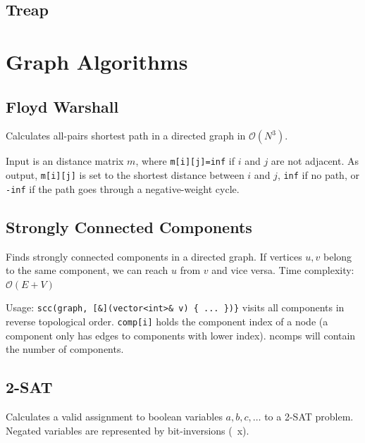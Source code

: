 \documentclass{article}
\begin{document}
\pagebreak

\subsection*{Treap}


\pagebreak

\section*{Graph Algorithms}

\subsection*{Floyd Warshall}

Calculates all-pairs shortest path in a directed graph in $\mathcal{O}(N^3)$.

Input is an distance matrix $m$, where \lstinline{m[i][j]=inf} if $i$ and $j$ are not adjacent.
As output, \lstinline{m[i][j]} is set to the shortest distance between $i$ and $j$,
\lstinline{inf} if no path, or \lstinline{-inf} if the path goes through a negative-weight cycle.




\subsection*{Strongly Connected Components}

Finds strongly connected components in a directed graph. If vertices $u, v$ belong to the same component, we can reach $u$ from $v$ and vice versa.
Time complexity: $\mathcal{O}(E + V)$

Usage: \lstinline|scc(graph, [&](vector<int>& v) { ... })}| visits all components
in reverse topological order. \texttt{comp[i]} holds the component
index of a node (a component only has edges to components with
lower index). ncomps will contain the number of components.



\pagebreak

\subsection*{2-SAT}

Calculates a valid assignment to boolean variables $a, b, c,\ldots$ to a 2-SAT problem.
Negated variables are represented by bit-inversions (~x).
\end{document}
